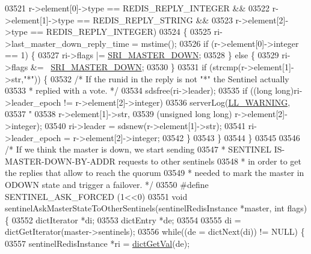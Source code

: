 \begin{DoxyCode}
{{{{{{{{{{{{{{{{{{{{{{{{{{{{{{{{{{{{{{{{{{{{{{{{{{{{{{{{{{{{{{{{{{{{{{{{{{{{{{03521         r->element[0]->type == REDIS\_REPLY\_INTEGER &&
03522         r->element[1]->type == REDIS\_REPLY\_STRING &&
03523         r->element[2]->type == REDIS\_REPLY\_INTEGER)
03524     \{
03525         ri->last\_master\_down\_reply\_time = mstime();
03526         \textcolor{keywordflow}{if} (r->element[0]->integer == 1) \{
03527             ri->flags |= \hyperlink{sentinel_8c_a80003592a6337bdc484182ff1d33e41c}{SRI\_MASTER\_DOWN};
03528         \} \textcolor{keywordflow}{else} \{
03529             ri->flags &= ~\hyperlink{sentinel_8c_a80003592a6337bdc484182ff1d33e41c}{SRI\_MASTER\_DOWN};
03530         \}
03531         \textcolor{keywordflow}{if} (strcmp(r->element[1]->str,\textcolor{stringliteral}{"*"})) \{
03532             \textcolor{comment}{/* If the runid in the reply is not "*" the Sentinel actually}
03533 \textcolor{comment}{             * replied with a vote. */}
03534             sdsfree(ri->leader);
03535             \textcolor{keywordflow}{if} ((\textcolor{keywordtype}{long} \textcolor{keywordtype}{long})ri->leader\_epoch != r->element[2]->integer)
03536                 serverLog(\hyperlink{server_8h_a31229b9334bba7d6be2a72970967a14b}{LL\_WARNING},
03537                     \textcolor{stringliteral}{"%
03538                     r->element[1]->str,
03539                     (\textcolor{keywordtype}{unsigned} \textcolor{keywordtype}{long} \textcolor{keywordtype}{long}) r->element[2]->integer);
03540             ri->leader = sdsnew(r->element[1]->str);
03541             ri->leader\_epoch = r->element[2]->integer;
03542         \}
03543     \}
03544 \}
03545 
03546 \textcolor{comment}{/* If we think the master is down, we start sending}
03547 \textcolor{comment}{ * SENTINEL IS-MASTER-DOWN-BY-ADDR requests to other sentinels}
03548 \textcolor{comment}{ * in order to get the replies that allow to reach the quorum}
03549 \textcolor{comment}{ * needed to mark the master in ODOWN state and trigger a failover. */}
03550 \textcolor{preprocessor}{#}\textcolor{preprocessor}{define} \textcolor{preprocessor}{SENTINEL\_ASK\_FORCED} \textcolor{preprocessor}{(}1\textcolor{preprocessor}{<<}0\textcolor{preprocessor}{)}
03551 \textcolor{keywordtype}{void} sentinelAskMasterStateToOtherSentinels(sentinelRedisInstance *master, \textcolor{keywordtype}{int} flags) \{
03552     dictIterator *di;
03553     dictEntry *de;
03554 
03555     di = dictGetIterator(master->sentinels);
03556     \textcolor{keywordflow}{while}((de = dictNext(di)) != NULL) \{
03557         sentinelRedisInstance *ri = \hyperlink{dict_8h_ae8d2cc391873b2bea2b87c4f80f43120}{dictGetVal}(de);
}}}}}}}}}}}}}}}}}}}}}}}}}}}}}}}}}}}}}}}}}}}}}}}}}}}}}}}}}}}}}}}}}}}}}}}}}}}}}}}
\end{DoxyCode}
